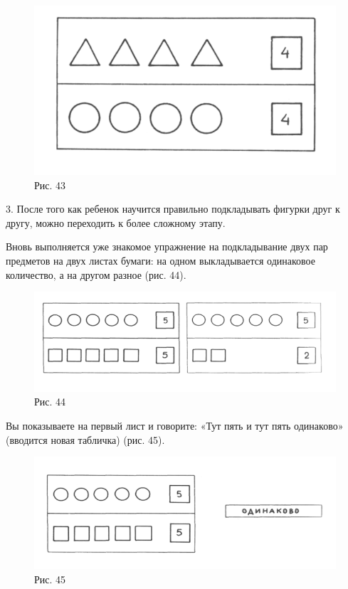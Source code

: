 \documentclass{book}
\begin{document}
\begin{figure}
\centering
\includegraphics[width=\linewidth]{media/media/image39.png}
\caption*{Рис. 43}
\end{figure}

3. После того как ребенок научится правильно подкладывать фигурки друг к
другу, можно переходить к более сложному этапу.

Вновь выполняется уже знакомое упражнение на подкладывание двух пар
предметов на двух листах бумаги: на одном выкладывается одинаковое
количество, а на другом разное (рис. 44).

\begin{figure}
\centering
\includegraphics[width=\linewidth]{media/media/image40.png}
\caption*{Рис. 44}
\end{figure}

Вы показываете на первый лист и говорите: «Тут пять и тут пять
одинаково» (вводится новая табличка) (рис. 45).

\begin{figure}
\centering
\includegraphics[width=\linewidth]{media/media/image41.png}
\caption*{Рис. 45}
\end{figure}
\end{document}
